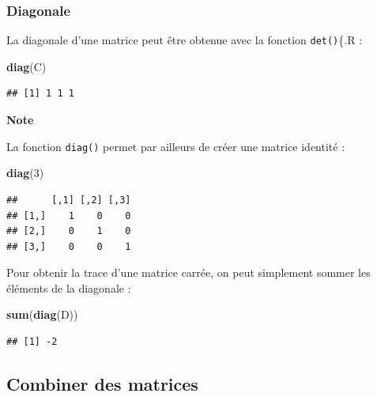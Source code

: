 \documentclass[
  11pt,
]{book}
\newenvironment{Shaded}{\begin{snugshade}}{\end{snugshade}}
\newcommand{\DecValTok}[1]{\textcolor[rgb]{0.00,0.00,0.81}{#1}}
\newcommand{\FunctionTok}[1]{\textcolor[rgb]{0.13,0.29,0.53}{\textbf{#1}}}
\newcommand{\NormalTok}[1]{#1}
\numberwithin{equation}{section}
\numberwithin{countremarque}{section}
\newenvironment{notebox}{
  \begin{tcolorbox}[breakable, colback=jaune,coltext=black,
                  colframe=grisfonce]}
 {\end{tcolorbox}}
\begin{document}
\hypertarget{diagonale}{%
\subsubsection{Diagonale}\label{diagonale}}

La diagonale d'une matrice peut être obtenue avec la fonction \texttt{det()}\{.R :

\begin{Shaded}
\begin{Highlighting}[]
\FunctionTok{diag}\NormalTok{(C)}
\end{Highlighting}
\end{Shaded}

\begin{lstlisting}
## [1] 1 1 1
\end{lstlisting}

\begin{notebox}

\textbf{Note}

La fonction \texttt{diag()} permet par ailleurs de créer une matrice identité :

\begin{Shaded}
\begin{Highlighting}[]
\FunctionTok{diag}\NormalTok{(}\DecValTok{3}\NormalTok{)}
\end{Highlighting}
\end{Shaded}

\begin{lstlisting}
##      [,1] [,2] [,3]
## [1,]    1    0    0
## [2,]    0    1    0
## [3,]    0    0    1
\end{lstlisting}

\end{notebox}

Pour obtenir la trace d'une matrice carrée, on peut simplement sommer les éléments de la diagonale :

\begin{Shaded}
\begin{Highlighting}[]
\FunctionTok{sum}\NormalTok{(}\FunctionTok{diag}\NormalTok{(D))}
\end{Highlighting}
\end{Shaded}

\begin{lstlisting}
## [1] -2
\end{lstlisting}

\hypertarget{combiner-des-matrices}{%
\subsection{Combiner des matrices}\label{combiner-des-matrices}}
\end{document}
